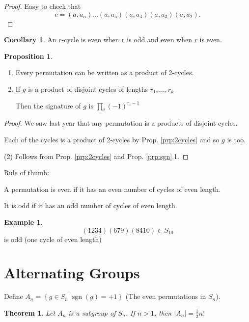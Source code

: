 \documentclass{article}
\newtheorem{theorem}{Theorem}[section]
\theoremstyle{definition}
\newtheorem{proposition}{Proposition}
\newtheorem*{corollary}{Corollary}
\newtheorem*{exmp}{Example}
\DeclareMathOperator{\sgn}{sgn}
\begin{document}
\begin{proof}
  Easy to check that
    $$c=(a,a_n)\ldots(a,a_5)(a,a_4)(a,a_3)(a,a_2).$$
\end{proof}

\begin{corollary}
  An $r$-cycle is even when $r$ is odd and even when $r$ is even.\\
\end{corollary}

\begin{proposition}\hfill
  \begin{enumerate}
    \item Every permutation can be written as a product of 2-cycles.
    \item If $g$ is a product of disjoint cycles of lengths $r_1, \ldots, r_k$

      Then the signature of $g$ is $\prod_{i} (-1)^{r_i - 1}$
  \end{enumerate}
\end{proposition}

\begin{proof}
  We saw last year that any permutation is a products of disjoint cycles.

  Each of the cycles is a product of 2-cycles by Prop. \ref{prp:2cycles} and so $g$ is too.

  (2) Follows from Prop. \ref{prp:2cycles} and Prop. \ref{prp:sgn}.1.
\end{proof}

Rule of thumb:

A permutation is even if it has an even number of cycles of even length.

It is odd if it has an odd number of cycles of even length.\\

\begin{exmp}
$$(1 2 3 4)(6 7 9)(8 4 10) \in S_{10}$$ is odd (one cycle of even length)
\end{exmp}


\section{Alternating Groups}

Define $A_n=\left\{ g \in S_n | \sgn(g) = +1 \right\}$ (The even permutations in $S_n$).\\

\begin{theorem}
  Let $A_n$ is a subgroup of $S_n$. If $n>1$, then $|A_n|=\frac{1}{2}n!$
  \label{thm:subgroup}
\end{theorem}
\end{document}
